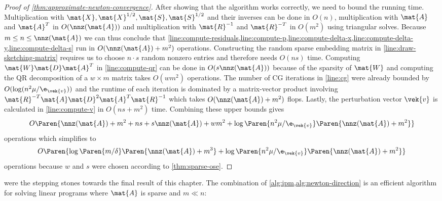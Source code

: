 \begin{proof}[Proof of \cref{thm:approximate-newton-convergence}]
  After showing that the algorithm works correctly, we need to bound the running time.
  Multiplication with \(\mat{X}, \mat{X}^{1/2}, \mat{S}, \mat{S}^{1/2}\) and their inverses can be done in \(O(n)\), multiplication with \(\mat{A}\) and \(\mat{A}^T\) in \(O(\nnz(\mat{A}))\) and multiplication with \(\mat{R}^{-1}\) and \(\mat{R}^{-T}\) in \(O(m^2)\) using triangular solves.
  Because \(m \leq n \leq \nnz(\mat{A})\) we can thus conclude that \cref{line:compute-residuals,line:compute-p,line:compute-delta-x,line:compute-delta-y,line:compute-delta-s} run in \(O(\nnz(\mat{A}) + m^2)\) operations.
  Constructing the random sparse embedding matrix in \cref{line:draw-sketching-matrix} requires us to choose \(n \cdot s\) random nonzero entries and therefore needs \(O(n s)\) time.
  Computing \(\mat{W}\mat{D}\mat{A}^T\) in \cref{line:compute-qr} can be done in \(O(s \nnz(\mat{A}))\) because of the sparsity of \(\mat{W}\) and computing the QR decomposition of a \(w \times m\) matrix takes \(O(w m^2)\) operations.
  The number of CG iterations in \cref{line:cg} were already bounded by \(O(\log(n^2 \mu / \e_{\vek{v}}))\) and the runtime of each iteration is dominated by a matrix-vector product involving \(\mat{R}^{-T}\mat{A}\mat{D}^2\mat{A}^T\mat{R}^{-1}\) which takes \(O(\nnz(\mat{A}) + m^2)\) flops.
  Lastly, the perturbation vector \(\vek{v}\) is calculated in \cref{line:compute-v} in \(O(ns + m^2)\) time.
  Combining these upper bounds gives
  \[ O \Paren{\nnz(\mat{A}) + m^2 + ns + s \nnz(\mat{A}) + wm^2 + \log \Paren{n^2 \mu / \e_{\vek{v}}} \Paren{\nnz(\mat{A}) + m^2}} \]
  operations which simplifies to
  \[ O \Paren{\log \Paren{m/\delta} \Paren{\nnz(\mat{A}) + m^3} + \log \Paren{n^2 \mu / \e_{\vek{v}}} \Paren{\nnz(\mat{A}) + m^2}} \]
  operations because \(w\) and \(s\) were chosen according to \cref{thm:sparse-ose}.
\end{proof}

 were the stepping stones towards the final result of this chapter.
The combination of \cref{alg:ipm,alg:newton-direction} is an efficient algorithm for solving linear programs where \(\mat{A}\) is sparse and \(m \ll n\):

